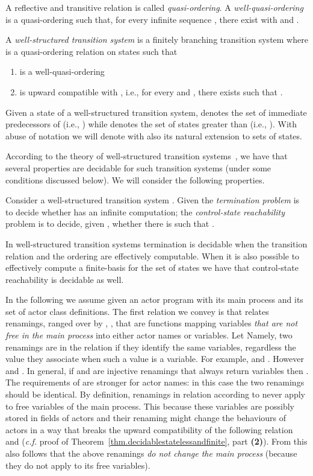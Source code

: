 \documentclass{LMCS}
\theoremstyle{plain}\newtheorem{proposition}[thm]{Proposition}
\theoremstyle{plain}\newtheorem{lemma}[thm]{Lemma}
\theoremstyle{plain}\newtheorem{theorem}[thm]{Theorem}
\theoremstyle{plain}\newtheorem{corollary}[thm]{Corollary}
\begin{document}
A reflective and transitive relation is called \emph{quasi-ordering}.
A \emph{well-quasi-ordering} is a quasi-ordering  such that, for every infinite sequence  
, there exist  with  and .

\begin{defi}A \emph{well-structured transition system} is a finitely branching transition system  where  is a quasi-ordering relation on states such that 
\begin{enumerate}
\item 
 is a well-quasi-ordering
\item 
 is upward compatible with , i.e., for every  and  , there exists  such that .
\end{enumerate}
\end{defi}

\noindent Given a state  of a well-structured transition system, 
denotes the set of immediate predecessors of  (i.e., )
while  denotes the set of states greater than  (i.e., ). With abuse of notation we will denote with 
also its natural extension to sets of states.


According to the theory of well-structured transition systems~\cite{abdulla:96,Finkel:2001},
we have that several properties are decidable for such transition systems
(under some conditions discussed below).
We will consider the following properties. 
\begin{defi}
\label{def.otherproblems}
Consider a well-structured transition system .
Given  the \emph{termination problem} is to 
decide whether  has an infinite computation;
the \emph{control-state reachability} problem is to decide,
given , whether there is  
such that .
\end{defi}
In well-structured transition systems termination is decidable when
the transition relation  and the ordering  are
effectively computable. When it is also possible to effectively compute
a finite-basis for the set of states  we have that 
control-state reachability is decidable as well. 

In the following we assume given an actor program with its 
main process and its set of actor class definitions.
The first relation we convey is  that relates renamings,
ranged over by , , 
that are functions mapping variables \emph{that are
not free in the main process} into either actor names or variables.
Let 
{\small
 }
Namely, two renamings are in the relation  if they identify the 
same variables, regardless the value they associate when such a value is a 
variable.
For example, 
and . However  and .
In general, if  and  are injective renamings that 
always return variables then . 
The requirements of  are stronger for actor names:
in this case the two renamings should be identical.
By definition, renamings in relation according to 
never apply to free variables of the main process.
This because these variables are possibly stored in fields of actors and their
renaming might change the behaviours of actors in a way that breaks the 
upward compatibility of the following relation  and 
(\emph{c.f.} proof of Theorem~\ref{thm.decidablestatelessandfinite}, part 
{\bf (2)}). From this also follows that the above renamings \emph{do not change the
main process} (because they do not apply to its free variables).
\end{document}
